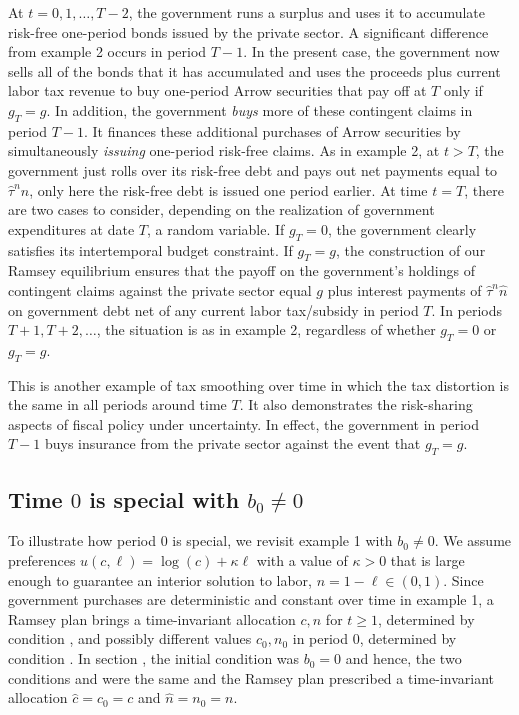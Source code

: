At $t=0,1, \ldots ,T-2$, the government
runs a surplus and uses  it to accumulate risk-free one-period bonds issued by the
private sector. A significant difference from example 2 occurs in
period $T-1$.  In the present case, the government now sells all of the bonds that it has accumulated and uses
the proceeds plus current labor tax revenue to buy one-period Arrow securities
that  pay off at $T$ only if $g_T=g$. In addition, the government {\it buys\/} more of these contingent
claims in period $T-1$. It finances these additional purchases of Arrow securities by simultaneously {\it issuing\/} one-period risk-free claims.
As in example 2,
at $t > T$, the government just rolls over its risk-free debt and pays out net
payments
equal to $\hat \tau^n \hat n$, only  here the risk-free debt is issued one period earlier.
At time $t=T$, there are two cases to consider, depending on the realization of  government expenditures at date $T$, a random variable.
If $g_T=0$, the government clearly satisfies
its intertemporal budget constraint. If $g_T=g$, the construction
of our Ramsey equilibrium ensures that the payoff on the government's
holdings of contingent claims against the private sector  equal
$g$ plus interest payments of $\hat \tau^n \hat n$ on government debt net
of any current labor tax/subsidy in period $T$. In periods $T+1,T+2,\ldots$,
the situation is as in example 2, regardless of whether $g_T=0$ or
$g_T=g$.

This is another example of tax smoothing over time in which the  tax distortion is the same in all periods around time $T$. It also
demonstrates the risk-sharing aspects of fiscal policy under uncertainty.
In effect, the government in period $T-1$ buys insurance from the private
sector against the event that $g_T=g$.


\subsection{Time $0$ is special with $b_0\not= 0$}
\label{sec:LucasStokey_ex1_b0}%
To illustrate how period $0$ is special, we revisit example 1
with $b_0\not= 0$. We assume preferences
$u(c,\ell)=\log(c) + \kappa \ell$ with a value of $\kappa>0$ that is
large enough to guarantee an interior solution to labor,
$n=1-\ell\in(0,1)$. Since government purchases are
deterministic and constant over time in example 1, a Ramsey plan
brings a time-invariant allocation $c,n$ for $t\geq 1$, determined
by condition , and possibly different values $c_0, n_0$
in period $0$, determined by condition .
In section ,
the initial condition was $b_0=0$ and hence, the two conditions
 and  were the same and the Ramsey plan
prescribed a time-invariant allocation $\hat c = c_0 = c$ and
$\hat n = n_0 = n$.


